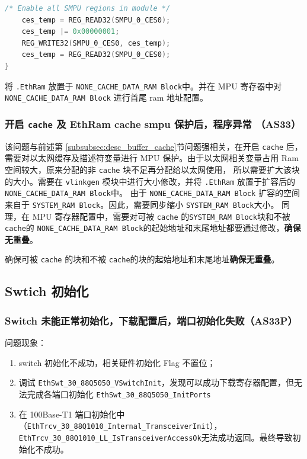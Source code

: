 \begin{lstlisting}[language=C,style=C]
    /* Enable all SMPU regions in module */
    ces_temp = REG_READ32(SMPU_0_CES0);
    ces_temp |= 0x00000001;
    REG_WRITE32(SMPU_0_CES0, ces_temp);
    ces_temp = REG_READ32(SMPU_0_CES0);
}
\end{lstlisting}

\begin{definition}[解决方案]
    将 \lstinline{.EthRam} 放置于 \lstinline{NONE_CACHE_DATA_RAM Block}中。并在 MPU 寄存器中对 \lstinline{NONE_CACHE_DATA_RAM Block} 进行首尾 ram 地址配置。
\end{definition}

\subsubsection{开启 \lstinline{cache} 及 EthRam cache smpu 保护后，程序异常 （AS33）}\label{subsubsec:smpu_address_overlap}

该问题与前述第 \ref{subsubsec:desc_buffer_cache}节问题强相关，在开启 \lstinline{cache} 后，需要对以太网缓存及描述符变量进行 MPU 保护。由于以太网相关变量占用 Ram空间较大，原来分配的非 \lstinline{cache} 块不足再分配给以太网使用，
所以需要扩大该块的大小。需要在 \lstinline{vlinkgen} 模块中进行大小修改，并将 \lstinline{.EthRam} 放置于扩容后的 \lstinline{NONE_CACHE_DATA_RAM Block}中。
由于 \lstinline{NONE_CACHE_DATA_RAM Block} 扩容的空间来自于 \lstinline{SYSTEM_RAM Block}。因此，需要同步缩小 \lstinline{SYSTEM_RAM Block}大小。
同理，在 MPU 寄存器配置中，需要对可被 \lstinline{cache} 的\lstinline{SYSTEM_RAM Block}块和不被 \lstinline{cache}的 \lstinline{NONE_CACHE_DATA_RAM Block}的起始地址和末尾地址都要通过修改，\textbf{确保无重叠}。

\begin{definition}[解决方案]
    确保可被 \lstinline{cache} 的块和不被 \lstinline{cache}的块的起始地址和末尾地址\textbf{确保无重叠}。
\end{definition}

\subsection{Swtich 初始化}

\subsubsection{Switch 未能正常初始化，下载配置后，端口初始化失败（AS33P）}\label{subsubsec:switch_init_error1}

问题现象：
\begin{enumerate}
    \item switch 初始化不成功，相关硬件初始化 Flag 不置位；
    \item 调试 \lstinline{EthSwt_30_88Q5050_VSwitchInit}，发现可以成功下载寄存器配置，但无法完成各端口初始化 \lstinline{EthSwt_30_88Q5050_InitPorts}
    \item 在 100Base-T1 端口初始化中（\lstinline{EthTrcv_30_88Q1010_Internal_TransceiverInit}），\lstinline{EthTrcv_30_88Q1010_LL_IsTransceiverAccessOk}无法成功返回。最终导致初始化不成功。
\end{enumerate}

